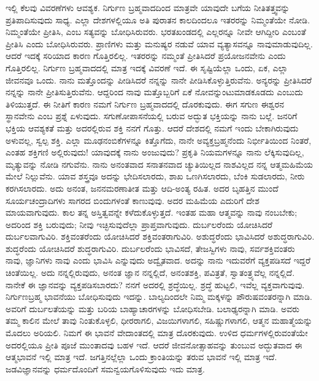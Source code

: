 ಇಲ್ಲಿ ಕೆಲವು ವಿವರಣೆಗಳು ಆವಶ್ಯಕ. ನಿರ್ಗುಣ ಬ್ರಹ್ಮವಾದದಿಂದ ಮಾತ್ರವೇ ಯಾವುದೇ ಬಗೆಯ ನೀತಿತತ್ತ್ವವನ್ನು ಪ್ರತಿಪಾದಿಸುವುದು ಸಾಧ್ಯ. ಎಲ್ಲಾ ದೇಶಗಳಲ್ಲಿಯೂ ಅತಿ ಪುರಾತನ ಕಾಲದಿಂದಲೂ ಇತರರನ್ನು ನಿಮ್ಮಂತೆಯೇ ನೋಡಿ. ನಿಮ್ಮಂತೆಯೇ ಪ್ರೀತಿಸಿ, ಎಂಬ ಸತ್ಯವನ್ನು ಬೋಧಿಸಿರುವರು. ಭರತಖಂಡದಲ್ಲಿ ಎಲ್ಲರನ್ನೂ ನೀವೇ ಆಗಿದ್ದೀರಿ ಎಂಬಂತೆ ಪ್ರೀತಿಸಿ ಎಂದು ಬೋಧಿಸಿರುವರು. ಪ್ರಾಣಿಗಳು ಮತ್ತು ಮನುಷ್ಯರ ನಡುವೆ ಯಾವ ವ್ಯತ್ಯಾಸವನ್ನೂ ನಾವುಮಾಡುವುದಿಲ್ಲ. ಆದರೆ ಇದಕ್ಕೆ ಸರಿಯಾದ ಕಾರಣ ಗೊತ್ತಿರಲಿಲ್ಲ. ಇತರರನ್ನು ನಮ್ಮಂತೆ ಪ್ರೀತಿಸಿದರೆ ಪ್ರಯೋಜನವೇನು ಎಂದು ಗೊತ್ತಿರಲಿಲ್ಲ. ನಿರ್ಗುಣ ಬ್ರಹ್ಮವಾದದಲ್ಲಿ ಮಾತ್ರ ಇದಕ್ಕೆ ವಿವರಣೆ ಇದೆ. ಈ ಸೃಷ್ಟಿಯೆಲ್ಲಾ ಒಂದು, ಏಕ, ಎಲ್ಲಾ ಜೀವನವೂ ಒಂದು. ನಾನು ಮತ್ತೊಂದನ್ನು ಪೀಡಿಸಿದರೆ ನನ್ನನ್ನು ನಾನೇ ಪೀಡಿಸಿಕೊಳ್ಳುತ್ತಿರುವೆನು. ಅನ್ಯರನ್ನು ಪ್ರೀತಿಸಿದರೆ ನನ್ನನ್ನು ನಾನೇ ಪ್ರೀತಿಸುತ್ತಿರುವೆನು. ಆದ್ದರಿಂದ ನಾವು ಮತ್ತೊಬ್ಬರಿಗೆ ಏಕೆ ನೋವನ್ನುಂಟುಮಾಡಕೂಡದು ಎಂಬುದು ತಿಳಿಯುತ್ತದೆ. ಈ ನೀತಿಗೆ ಕಾರಣ ನಮಗೆ ನಿರ್ಗುಣ ಬ್ರಹ್ಮವಾದದಲ್ಲಿ ದೊರಕುವುದು. ಈಗ ಸಗುಣ ಈಶ್ವರನ ಸ್ಥಾನವೇನು ಎಂಬ ಪ್ರಶ್ನೆ ಏಳುವುದು. ಸಗುಣೋಪಾಸನೆಯಲ್ಲಿ ಬರುವ ಅದ್ಭುತ ಭಕ್ತಿಯನ್ನು ನಾನು ಬಲ್ಲೆ. ಜನರಿಗೆ ಭಕ್ತಿಯ ಆವಶ್ಯಕತೆ ಮತ್ತು ಅದರಲ್ಲಿರುವ ಶಕ್ತಿ ನನಗೆ ಗೊತ್ತು. ಆದರೆ ದೇಶದಲ್ಲಿ ನಮಗೆ ಇಂದು ಬೇಕಾಗಿರುವುದು ಅಳುವಲ್ಲ, ಸ್ವಲ್ಪ ಶಕ್ತಿ. ಎಲ್ಲಾ ಮೂಢನಂಬಿಕೆಗಳನ್ನೂ ಕಿತ್ತೊಗೆದು, ನಾನೇ ಅವ್ಯಕ್ತಬ್ರಹ್ಮನೆಂದು ನಿರ್ಭೀತಿಯಿಂದ ನಿಂತರೆ, ಎಂತಹ ಶಕ್ತಿಗಣಿ ಅಲ್ಲಿರುವುದು! ಯಾವುದಕ್ಕೆ ನಾನು ಅಂಜುವುದು? ಪ್ರಕೃತಿ ನಿಯಮಗಳನ್ನೂ ನಾನು ಲೆಕ್ಕಿಸುವುದಿಲ್ಲ, ಮೃತ್ಯುವನ್ನು ನೋಡಿ ನಗುವೆನು. ನಾನು ಅನಂತವಾದ ಸನಾತನವಾದ ಚ್ಯುತಿಯಿಲ್ಲದ ನಾಶವಿಲ್ಲದ ನನ್ನ ಆತ್ಮಮಹಿಮೆಯ ಮೇಲೆ ನಿಲ್ಲುವೆನು. ಯಾವ ಶಸ್ತ್ರವೂ ಅದನ್ನು ಭೇದಿಸಲಾರದು, ಶಾಖ ಒಣಗಿಸಲಾರದು, ಬೆಂಕಿ ಸುಡಲಾರದು, ನೀರು ಕರಗಿಸಲಾರದು. ಅದು ಅನಂತ, ಜನನಮರಣಾತೀತ ಮತ್ತು ಆದಿ-ಅಂತ್ಯ ರಹಿತ. ಅದರ ಬೃಹತ್ತಿನ ಮುಂದೆ ಸೂರ್ಯಚಂದ್ರಾದಿಗಳು ಸಾಗರದ ಬಿಂದುಗಳಂತೆ ಕಾಣುವುವು. ಅದರ ಮಹಿಮೆಯ ಎದುರಿಗೆ ದೇಶ ಮಾಯವಾಗುವುದು. ಕಾಲ ತನ್ನ ಅಸ್ತಿತ್ವವನ್ನೇ ಕಳೆದುಕೊಳ್ಳುತ್ತದೆ. ಇಂತಹ ಮಹಾ ಆತ್ಮವನ್ನು ನಾವು ನಂಬಬೇಕು; ಅದರಿಂದ ಶಕ್ತಿ ಬರುವುದು; ನೀವು ಇಚ್ಛಿಸುವುದೆಲ್ಲಾ ಪ್ರಾಪ್ತವಾಗುವುದು. ದುರ್ಬಲರೆಂದು ಯೋಚಿಸಿದರೆ ದುರ್ಬಲವಾಗುವಿರಿ. ಶಕ್ತಿವಂತರೆಂದು ಯೋಚಿಸಿದರೆ ಶಕ್ತಿವಂತರಾಗುವಿರಿ. ಅಶುದ್ಧರೆಂದು ಭಾವಿಸಿದರೆ ಅಶುದ್ಧರಾಗುವಿರಿ. ಶುದ್ಧರೆಂದು ಯೋಚಿಸಿದರೆ ಶುದ್ಧರಾಗುವಿರಿ. ದುರ್ಬಲರೆಂದು ಭಾವಿಸದೆ, ತೇಜಸ್ವಿಗಳು ನಾವು, ಸರ್ವಶಕ್ತಿವಂತರು ನಾವು, ಜ್ಞಾನಿಗಳು ನಾವು ಎಂದು ಭಾವಿಸಿ ಎನ್ನುವುದು ಅದ್ವೈತವಾದ. ಅದನ್ನು ನಾನು ಇದುವರೆಗೆ ವ್ಯಕ್ತಪಡಿಸದೆ ಇದ್ದರೆ ಚಿಂತೆಯಿಲ್ಲ. ಅದು ನನ್ನಲ್ಲಿರುವುದು, ಅನಂತ ಜ್ಞಾನ ನನ್ನಲ್ಲಿದೆ, ಅನಂತಶಕ್ತಿ, ಪವಿತ್ರತೆ, ಸ್ವಾತಂತ್ರ್ಯವೆಲ್ಲ ನನ್ನಲ್ಲಿದೆ. ನಾನೇಕೆ ಈ ಜ್ಞಾನವನ್ನು ವ್ಯಕ್ತಪಡಿಸಬಾರದು? ನನಗೆ ಅದರಲ್ಲಿ ಶ್ರದ್ಧೆಯಿಲ್ಲ. ಶ್ರದ್ಧೆ ಹುಟ್ಟಲಿ, ಇವೆಲ್ಲ ವ್ಯಕ್ತವಾಗುವುವು. ನಿರ್ಗುಣಬ್ರಹ್ಮ ಭಾವನೆಯು ಬೋಧಿಸುವುದು ಇದನ್ನು. ಬಾಲ್ಯದಿಂದಲೇ ನಿಮ್ಮ ಮಕ್ಕಳನ್ನು ಪೌರುಷವಂತರನ್ನಾಗಿ ಮಾಡಿ. ಅವರಿಗೆ ದುರ್ಬಲತೆಯನ್ನು ಮತ್ತು ಬರಿಯ ಬಾಹ್ಯಾಚಾರಗಳನ್ನು ಬೋಧಿಸಬೇಡಿ. ಬಲಾಢ್ಯರನ್ನಾಗಿ ಮಾಡಿ. ಅವರು ತಮ್ಮ ಕಾಲಿನ ಮೇಲೆ ತಾವು ನಿಂತುಕೊಳ್ಳಲಿ, ಧೀರರಾಗಲಿ, ವಿಜಯಿಗಳಾಗಲಿ, ಸಹಿಷ್ಣುಗಳಾಗಲಿ, ಆತ್ಮನ ಮಹಾತ್ಮೆಯನ್ನು ಮೊದಲು ಅರಿಯಲಿ. ನಿಮಗೆ ಈ ಭಾವನೆ ವೇದಾಂತದಲ್ಲಿ ಮಾತ್ರ ದೊರಕುವುದು. ಉಳಿದ ಧರ್ಮಗಳಲ್ಲಿರುವಂತೆಯೇ ಅದರಲ್ಲಿಯೂ ಪ್ರೀತಿ ಪೂಜೆ ಮುಂತಾದವು ಬಹಳ ಇದೆ. ಆದರೆ ಜೀವನೋತ್ಸಾಹವನ್ನು ತುಂಬುವ ಅದ್ಭುತವಾದ ಈ ಆತ್ಮಭಾವನೆ ಇಲ್ಲಿ ಮಾತ್ರ ಇದೆ. ಜಗತ್ತಿನಲ್ಲೆಲ್ಲಾ ಒಂದು ಕ್ರಾಂತಿಯನ್ನು ತರುವ ಭಾವನೆ ಇಲ್ಲಿ ಮಾತ್ರ ಇದೆ. ಜಡವಿಜ್ಞಾನವನ್ನು ಧರ್ಮದೊಂದಿಗೆ ಸಮನ್ವಯಗೊಳಿಸುವುದು ಇದು ಮಾತ್ರ.

